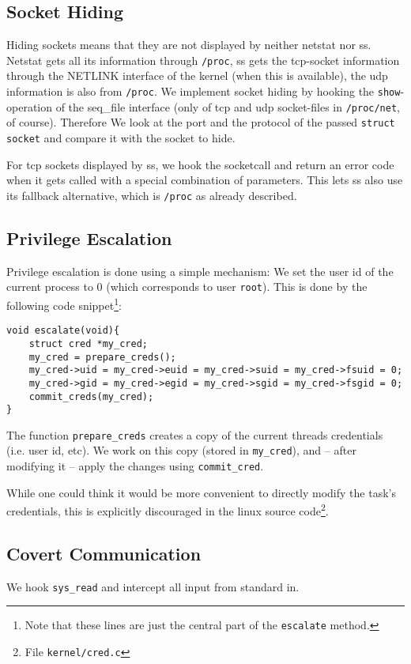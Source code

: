 \documentclass[10pt, letterpaper]{article}
\begin{document}
\subsection{Socket Hiding}
Hiding sockets means that they are not displayed by neither netstat nor ss.
Netstat gets all its information through \texttt{/proc}, ss gets the tcp-socket information through the NETLINK interface of the kernel (when this is available), the udp information is also from \texttt{/proc}.
We implement socket hiding by hooking the \texttt{show}-operation of the seq\_file interface (only of tcp and udp socket-files in \texttt{/proc/net}, of course). Therefore We look at the port and the protocol of the passed \texttt{struct socket} and compare it with the socket to hide.

For tcp sockets displayed by ss, we hook the socketcall and return an error code when it gets called with a special combination of parameters. This lets ss also use its fallback alternative, which is \texttt{/proc} as already described.
\subsection{Privilege Escalation}

Privilege escalation is done using a simple mechanism: We set the user id of the current process to 0 (which corresponds to user \texttt{root}). This is done by the following code snippet\footnote{Note that these lines are just the central part of the \texttt{escalate} method.}:

\begin{verbatim}
void escalate(void){
    struct cred *my_cred;
    my_cred = prepare_creds(); 
    my_cred->uid = my_cred->euid = my_cred->suid = my_cred->fsuid = 0;
    my_cred->gid = my_cred->egid = my_cred->sgid = my_cred->fsgid = 0;
    commit_creds(my_cred);
}
\end{verbatim}

The function \texttt{prepare\_creds} creates a copy of the current threads credentials (i.e. user id, etc). We work on this copy (stored in \texttt{my\_cred}), and -- after modifying it -- apply the changes using \texttt{commit\_cred}.

While one could think it would be more convenient to directly modify the task's credentials, this is explicitly discouraged in the linux source code\footnote{File \texttt{kernel/cred.c}}.

\subsection{Covert Communication}
We hook \texttt{sys\_read} and intercept all input from standard in. 
\end{document}
